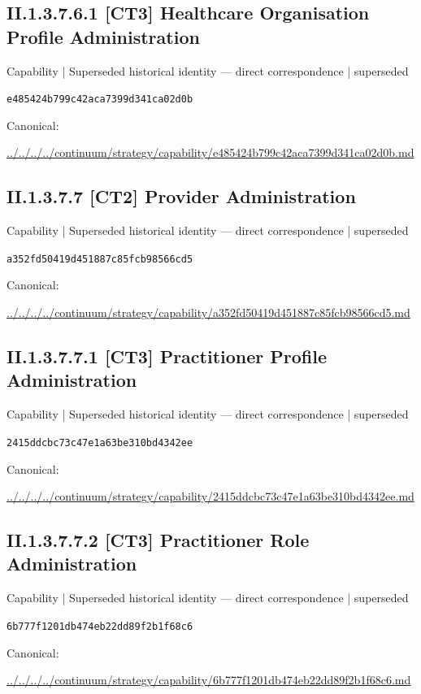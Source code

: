 \documentclass[10pt,a4paper]{article}
\begin{document}
\subsection*{II.1.3.7.6.1 [CT3] Healthcare Organisation Profile Administration}
{\small Capability | Superseded historical identity — direct correspondence | superseded}\par
\texttt{e485424b799c42aca7399d341ca02d0b}\par
Canonical: \par
{\footnotesize\url{../../../../continuum/strategy/capability/e485424b799c42aca7399d341ca02d0b.md}}\par
\subsection*{II.1.3.7.7 [CT2] Provider Administration}
{\small Capability | Superseded historical identity — direct correspondence | superseded}\par
\texttt{a352fd50419d451887c85fcb98566cd5}\par
Canonical: \par
{\footnotesize\url{../../../../continuum/strategy/capability/a352fd50419d451887c85fcb98566cd5.md}}\par
\subsection*{II.1.3.7.7.1 [CT3] Practitioner Profile Administration}
{\small Capability | Superseded historical identity — direct correspondence | superseded}\par
\texttt{2415ddcbc73c47e1a63be310bd4342ee}\par
Canonical: \par
{\footnotesize\url{../../../../continuum/strategy/capability/2415ddcbc73c47e1a63be310bd4342ee.md}}\par
\subsection*{II.1.3.7.7.2 [CT3] Practitioner Role Administration}
{\small Capability | Superseded historical identity — direct correspondence | superseded}\par
\texttt{6b777f1201db474eb22dd89f2b1f68c6}\par
Canonical: \par
{\footnotesize\url{../../../../continuum/strategy/capability/6b777f1201db474eb22dd89f2b1f68c6.md}}\par
\end{document}

